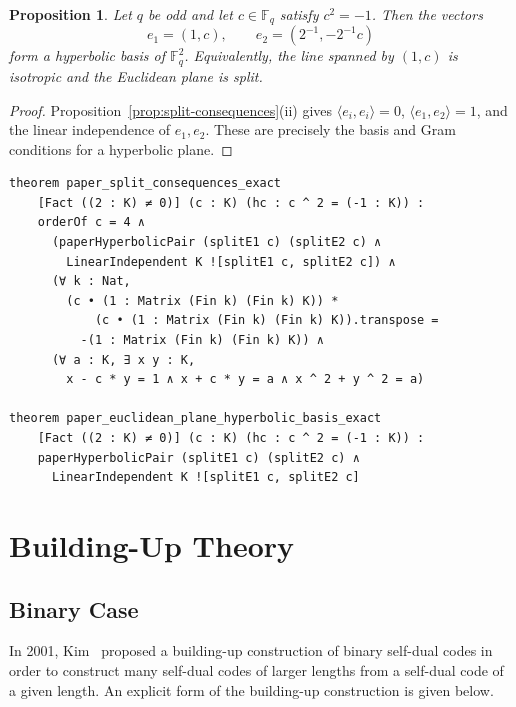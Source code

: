 \documentclass[12pt]{article}
\newtheorem{prop}[theorem]{Proposition}
\newcommand{\F}{\mathbb{F}}
\begin{document}
\begin{prop}\label{prop:eucl-hyp}
Let \(q\) be odd and let \(c\in\F_q\) satisfy \(c^2=-1\). Then the vectors
\[
e_1=(1,c), \qquad e_2=(2^{-1},-2^{-1}c)
\]
form a hyperbolic basis of\/ $\F_q^2$. Equivalently, the line spanned by $(1,c)$ is isotropic and the Euclidean plane is split.
\end{prop}

\begin{proof}
Proposition~\ref{prop:split-consequences}(ii) gives
\(\langle e_i,e_i\rangle=0\), \(\langle e_1,e_2\rangle=1\), and the
linear independence of \(e_1,e_2\). These are precisely the basis and Gram
conditions for a hyperbolic plane.
\end{proof}

\begin{lstlisting}[caption={Lean for Proposition~\ref{prop:split-consequences} and Proposition~\ref{prop:eucl-hyp}.}]
theorem paper_split_consequences_exact
    [Fact ((2 : K) ≠ 0)] (c : K) (hc : c ^ 2 = (-1 : K)) :
    orderOf c = 4 ∧
      (paperHyperbolicPair (splitE1 c) (splitE2 c) ∧
        LinearIndependent K ![splitE1 c, splitE2 c]) ∧
      (∀ k : Nat,
        (c • (1 : Matrix (Fin k) (Fin k) K)) *
            (c • (1 : Matrix (Fin k) (Fin k) K)).transpose =
          -(1 : Matrix (Fin k) (Fin k) K)) ∧
      (∀ a : K, ∃ x y : K,
        x - c * y = 1 ∧ x + c * y = a ∧ x ^ 2 + y ^ 2 = a)

theorem paper_euclidean_plane_hyperbolic_basis_exact
    [Fact ((2 : K) ≠ 0)] (c : K) (hc : c ^ 2 = (-1 : K)) :
    paperHyperbolicPair (splitE1 c) (splitE2 c) ∧
      LinearIndependent K ![splitE1 c, splitE2 c]
\end{lstlisting}

\section{Building-Up Theory}
\label{sec:building-up}

\subsection{Binary Case}

In 2001, Kim~\cite{Kim2001} proposed a building-up construction of binary self-dual codes in order to construct many self-dual codes of larger lengths from a self-dual code of a given length. An explicit form of the building-up construction is given below.
\end{document}
